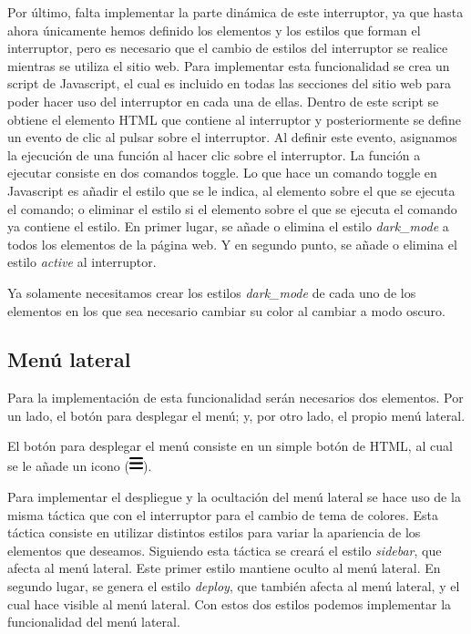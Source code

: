 Por último, falta implementar la parte dinámica de este interruptor, ya que hasta ahora únicamente hemos definido los elementos y los estilos que forman el interruptor, pero es necesario que el cambio de estilos del interruptor se realice mientras se utiliza el sitio web. Para implementar esta funcionalidad se crea un script de Javascript, el cual es incluido en todas las secciones del sitio web para poder hacer uso del interruptor en cada una de ellas. Dentro de este script se obtiene el elemento HTML que contiene al interruptor y posteriormente se define un evento de clic al pulsar sobre el interruptor. Al definir este evento, asignamos la ejecución de una función al hacer clic sobre el interruptor. La función a ejecutar consiste en dos comandos toggle. Lo que hace un comando toggle en Javascript es añadir el estilo que se le indica, al elemento sobre el que se ejecuta el comando; o eliminar el estilo si el elemento sobre el que se ejecuta el comando ya contiene el estilo. En primer lugar, se añade o elimina el estilo \textit{dark\_mode} a todos los elementos de la página web. Y en segundo punto, se añade o elimina el estilo \textit{active} al interruptor.

Ya solamente necesitamos crear los estilos \textit{dark\_mode} de cada uno de los elementos en los que sea necesario cambiar su color al cambiar a modo oscuro.

\subsection{Menú lateral}

Para la implementación de esta funcionalidad serán necesarios dos elementos. Por un lado, el botón para desplegar el menú; y, por otro lado, el propio menú lateral.

El botón para desplegar el menú consiste en un simple botón de HTML, al cual se le añade un icono (\includegraphics[width=0.03\textwidth]{imagenes/07_Implementacion/bars-solid.png}).

Para implementar el despliegue y la ocultación del menú lateral se hace uso de la misma táctica que con el interruptor para el cambio de tema de colores. Esta táctica consiste en utilizar distintos estilos para variar la apariencia de los elementos que deseamos. Siguiendo esta táctica se creará el estilo \textit{sidebar}, que afecta al menú lateral. Este primer estilo mantiene oculto al menú lateral. En segundo lugar, se genera el estilo \textit{deploy}, que también afecta al menú lateral, y el cual hace visible al menú lateral. Con estos dos estilos podemos implementar la funcionalidad del menú lateral.

